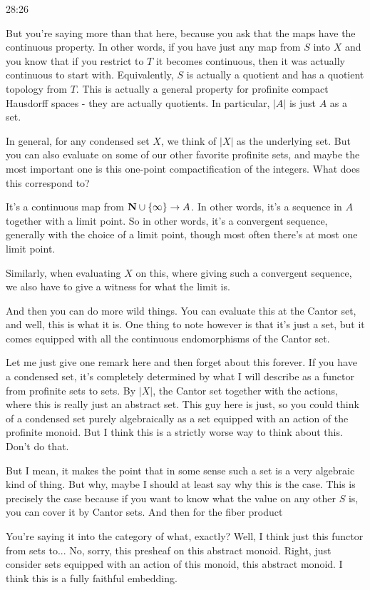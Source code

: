\begin{example}
\begin{unfinished}{28:26}
\begin{remark}
But you're saying more than that here, because you ask that the maps have the continuous property. In other words, if you have just any map from $S$ into $X$ and you know that if you restrict to $T$ it becomes continuous, then it was actually continuous to start with. Equivalently, $S$ is actually a quotient and has a quotient topology from $T$. This is actually a general property for profinite compact Hausdorff spaces - they are actually quotients. In particular, $|A|$ is just $A$ as a set.

In general, for any condensed set $X$, we think of $|X|$ as the underlying set. But you can also evaluate on some of our other favorite profinite sets, and maybe the most important one is this one-point compactification of the integers. What does this correspond to?

It's a continuous map from $\mathbf N \cup \{\infty\} \to A$. In other words, it's a sequence in $A$ together with a limit point. So in other words, it's a convergent sequence, generally with the choice of a limit point, though most often there's at most one limit point. 

Similarly, when evaluating $X$ on this, where giving such a convergent sequence, we also have to give a witness for what the limit is.

And then you can do more wild things. You can evaluate this at the Cantor set, and well, this is what it is. One thing to note however is that it's just a set, but it comes equipped with all the continuous endomorphisms of the Cantor set.

\begin{remark}
Let me just give one remark here and then forget about this forever. If you have a condensed set, it's completely determined by what I will describe as a functor from profinite sets to sets. By $|X|$, the Cantor set together with the actions, where this is really just an abstract set. This guy here is just, so you could think of a condensed set purely algebraically as a set equipped with an action of the profinite monoid. But I think this is a strictly worse way to think about this. Don't do that.

But I mean, it makes the point that in some sense such a set is a very algebraic kind of thing. But why, maybe I should at least say why this is the case. This is precisely the case because if you want to know what the value on any other $S$ is, you can cover it by Cantor sets. And then for the fiber product

You're saying it into the category of what, exactly? Well, I think just this functor from sets to... No, sorry, this presheaf on this abstract monoid. Right, just consider sets equipped with an action of this monoid, this abstract monoid. I think this is a fully faithful embedding.


\end{remark}
\end{remark}
\end{unfinished}
\end{example}
